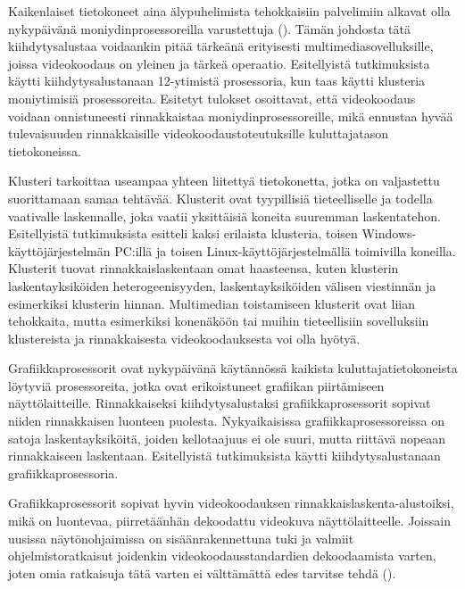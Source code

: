 Kaikenlaiset tietokoneet aina älypuhelimista tehokkaisiin palvelimiin alkavat
olla nykypäivänä moniydinprosessoreilla varustettuja (\citealt{choi}). Tämän
johdosta tätä kiihdytysalustaa voidaankin pitää tärkeänä erityisesti
multimediasovelluksille, joissa videokoodaus on yleinen ja tärkeä operaatio.
Esitellyistä tutkimuksista \citealt{chi} käytti kiihdytysalustanaan 12-ytimistä
prosessoria, kun taas \citealt{li} käytti klusteria moniytimisiä prosessoreita.
Esitetyt tulokset osoittavat, että videokoodaus voidaan onnistuneesti
rinnakkaistaa moniydinprosessoreille, mikä ennustaa hyvää tulevaisuuden
rinnakkaisille videokoodaustoteutuksille kuluttajatason tietokoneissa.


Klusteri tarkoittaa useampaa yhteen liitettyä tietokonetta, jotka on valjastettu
suorittamaan samaa tehtävää. Klusterit ovat tyypillisiä tieteelliselle ja
todella vaativalle laskennalle, joka vaatii yksittäisiä koneita suuremman 
laskentatehon. Esitellyistä tutkimuksista \citealt{li} esitteli kaksi erilaista
klusteria, toisen Windows-käyttöjärjestelmän PC:illä ja toisen
Linux-käyttöjärjestelmällä toimivilla koneilla. Klusterit tuovat 
rinnakkaislaskentaan omat haasteensa, kuten klusterin laskentayksiköiden
heterogeenisyyden, laskentayksiköiden välisen viestinnän ja esimerkiksi
klusterin hinnan. Multimedian toistamiseen klusterit ovat liian tehokkaita,
mutta esimerkiksi konenäköön tai muihin tieteellisiin sovelluksiin klustereista
ja rinnakkaisesta videokoodauksesta voi olla hyötyä.


Grafiikkaprosessorit ovat nykypäivänä käytännössä kaikista
kuluttajatietokoneista löytyviä prosessoreita, jotka ovat erikoistuneet
grafiikan piirtämiseen näyttölaitteille. Rinnakkaiseksi kiihdytysalustaksi
grafiikkaprosessorit sopivat niiden rinnakkaisen luonteen puolesta.
Nykyaikaisissa grafiikkaprosessoreissa on satoja laskentayksiköitä, joiden
kellotaajuus ei ole suuri, mutta riittävä nopeaan rinnakkaiseen laskentaan.
Esitellyistä tutkimuksista \citealt{pieters} käytti kiihdytysalustanaan
grafiikkaprosessoria.

Grafiikkaprosessorit sopivat hyvin videokoodauksen
rinnakkaislaskenta-alustoiksi, mikä on luontevaa, piirretäänhän dekoodattu
videokuva näyttölaitteelle. Joissain uusissa näytönohjaimissa on
sisäänrakennettuna tuki ja valmiit ohjelmistoratkaisut joidenkin videokoodausstandardien dekoodaamista
varten, joten omia ratkaisuja tätä varten ei välttämättä edes tarvitse tehdä (\citealt{nvidia}).


